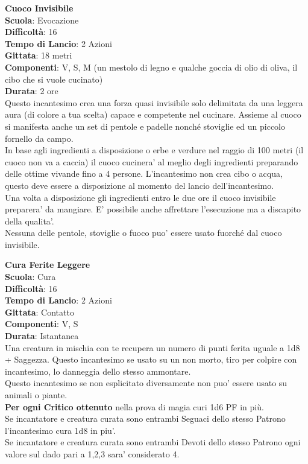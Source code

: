 \begin{multicols}{2}
\medskip\textbf{Cuoco Invisibile}\\
\textbf{Scuola}: Evocazione\\
\textbf{Difficoltà}: 16\\
\textbf{Tempo di Lancio}: 2 Azioni\\
\textbf{Gittata}: 18 metri\\
\textbf{Componenti}: V, S, M (un mestolo di legno e qualche goccia di olio di oliva, il cibo che si vuole cucinato)\\
\textbf{Durata}: 2 ore\\
Questo incantesimo crea una forza quasi invisibile solo delimitata da una leggera aura (di colore a tua scelta) capace e competente nel cucinare. Assieme al cuoco si manifesta anche un set di pentole e padelle nonché stoviglie ed un piccolo fornello da campo.\\
In base agli ingredienti a disposizione o erbe e verdure nel raggio di 100 metri (il cuoco non va a caccia) il cuoco cucinera' al meglio degli ingredienti preparando delle ottime vivande fino a 4 persone. L'incantesimo non crea cibo o acqua, questo deve essere a disposizione al momento del lancio dell'incantesimo. \\
Una volta a disposizione gli ingredienti entro le due ore il cuoco invisibile preparera' da mangiare. E' possibile anche affrettare l'esecuzione ma a discapito della qualita'.\\
Nessuna delle pentole, stoviglie o fuoco puo' essere usato fuorché dal cuoco invisibile.

\medskip\textbf{Cura Ferite Leggere}\\
\textbf{Scuola}: Cura\\
\textbf{Difficoltà}: 16\\
\textbf{Tempo di Lancio}: 2 Azioni\\
\textbf{Gittata}: Contatto\\
\textbf{Componenti}: V, S\\
\textbf{Durata}: Istantanea\\
Una creatura in mischia con te recupera un numero di punti ferita uguale a 1d8 + Saggezza. Questo incantesimo se usato su un non morto, tiro per colpire con incantesimo, lo danneggia dello stesso ammontare.\\
Questo incantesimo se non esplicitato diversamente non puo' essere usato su animali o piante.\\
\textbf{Per ogni Critico ottenuto} nella prova di magia curi 1d6 PF in più.\\
Se incantatore e creatura curata sono entrambi Seguaci dello stesso Patrono l'incantesimo cura 1d8 in piu'.\\
Se incantatore e creatura curata sono entrambi Devoti dello stesso Patrono ogni valore sul dado pari a 1,2,3 sara' considerato 4.\\


\end{multicols}
